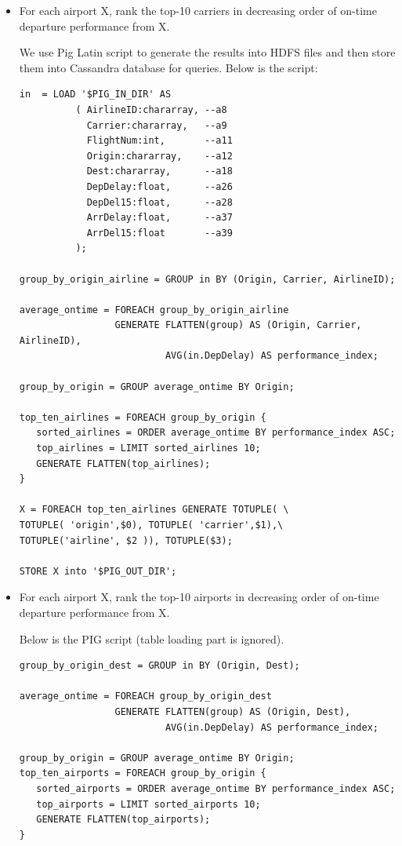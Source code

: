 \documentclass[fontsize=11pt,paper=a4]{scrartcl}
\begin{document}
\begin{itemize} 
\item For each airport X, rank the top-10 carriers in decreasing order of on-time departure performance from X.

We use Pig Latin script to generate the results into HDFS files and then store them into Cassandra database for queries. Below is the script: 

\small\begin{verbatim}
in  = LOAD '$PIG_IN_DIR' AS 
          ( AirlineID:chararray, --a8
            Carrier:chararray,   --a9
            FlightNum:int,       --a11
            Origin:chararray,    --a12       
            Dest:chararray,      --a18
            DepDelay:float,      --a26
            DepDel15:float,      --a28
            ArrDelay:float,      --a37 
            ArrDel15:float       --a39
          );
	
group_by_origin_airline = GROUP in BY (Origin, Carrier, AirlineID);

average_ontime = FOREACH group_by_origin_airline 
                 GENERATE FLATTEN(group) AS (Origin, Carrier, AirlineID), 
                          AVG(in.DepDelay) AS performance_index;

group_by_origin = GROUP average_ontime BY Origin; 
 
top_ten_airlines = FOREACH group_by_origin {
   sorted_airlines = ORDER average_ontime BY performance_index ASC;
   top_airlines = LIMIT sorted_airlines 10;
   GENERATE FLATTEN(top_airlines);
}

X = FOREACH top_ten_airlines GENERATE TOTUPLE( \
TOTUPLE( 'origin',$0), TOTUPLE( 'carrier',$1),\
TOTUPLE('airline', $2 )), TOTUPLE($3);

STORE X into '$PIG_OUT_DIR'; 
\end{verbatim}
\normalsize

\item For each airport X, rank the top-10 airports in decreasing order of on-time departure performance from X.

Below is the PIG script (table loading part is ignored). 
\small\begin{verbatim}
group_by_origin_dest = GROUP in BY (Origin, Dest);

average_ontime = FOREACH group_by_origin_dest 
                 GENERATE FLATTEN(group) AS (Origin, Dest), 
                          AVG(in.DepDelay) AS performance_index;

group_by_origin = GROUP average_ontime BY Origin; 
top_ten_airports = FOREACH group_by_origin {
   sorted_airports = ORDER average_ontime BY performance_index ASC;
   top_airports = LIMIT sorted_airports 10;
   GENERATE FLATTEN(top_airports);
}


\end{verbatim}
\end{itemize}
\end{document}
